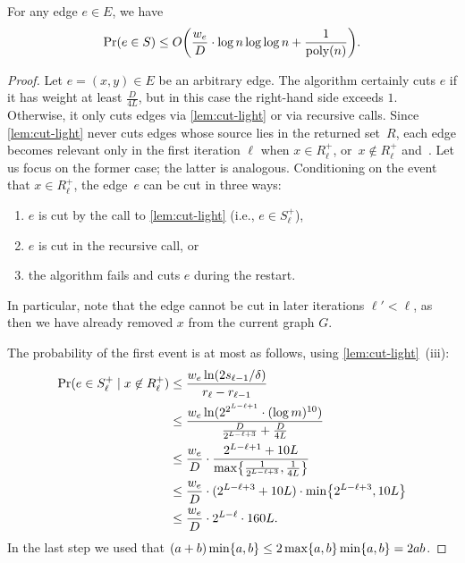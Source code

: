 \documentclass[letterpaper,11pt]{article}
\begin{document}
\begin{lemma} \label{lem:ldd-fast-prob}
For any edge $e \in E$, we have
\begin{equation*}
    \Pr(e \in S) \leq \Order\parens*{\frac{w_e}{D} \cdot \log n \log\log n + \frac{1}{\poly(n)}}.
\end{equation*}
\end{lemma}
\begin{proof}
Let $e = (x, y) \in E$ be an arbitrary edge. The algorithm certainly cuts $e$ if it has weight at least $\frac{D}{4L}$, but in this case the right-hand side exceeds $1$. Otherwise, it only cuts edges via \cref{lem:cut-light} or via recursive calls. Since \cref{lem:cut-light} never cuts edges whose source lies in the returned set~$R$, each edge becomes relevant only in the first iteration $\ell$ when $x \in R_\ell^+$, or~$x \not\in R_\ell^+$ and~. Let us focus on the former case; the latter is analogous. Conditioning on the event that $x \in R_\ell^+$, the edge~$e$ can be cut in three ways:
\begin{enumerate}
    \item $e$ is cut by the call to \cref{lem:cut-light} (i.e., $e \in S^+_\ell$),
    \item $e$ is cut in the recursive call, or
    \item the algorithm fails and cuts $e$ during the restart.
\end{enumerate}
In particular, note that the edge cannot be cut in later iterations $\ell' < \ell$, as then we have already removed $x$ from the current graph $G$.

The probability of the first event is at most as follows, using \cref{lem:cut-light}~(iii):
\begin{align*}
    \Pr(e \in S^+_\ell \mid x \not\in R^+_\ell)
    &\leq \frac{w_e \ln(2s_{\ell-1} / \delta)}{r_\ell - r_{\ell-1}} \\
    &\leq \frac{w_e \ln(2^{2^{L - \ell + 1}} \cdot (\log m)^{10})}{\frac{D}{2^{L-\ell+3}} + \frac{D}{4L}} \\
    &\leq \frac{w_e}{D} \cdot \frac{2^{L - \ell + 1} + 10L}{\max\set*{\frac{1}{2^{L-\ell+3}}, \frac{1}{4L}}} \\
    &\leq \frac{w_e}{D} \cdot (2^{L-\ell+3} + 10L) \cdot \min\set*{2^{L-\ell+3}, 10L} \\
    &\leq \frac{w_e}{D} \cdot 2^{L-\ell} \cdot 160L.
\end{align*}
In the last step we used that $(a + b) \min\lbrace a, b\rbrace \leq 2 \max\lbrace a, b\rbrace \min\lbrace a, b\rbrace = 2ab$.


\end{proof}
\end{document}
